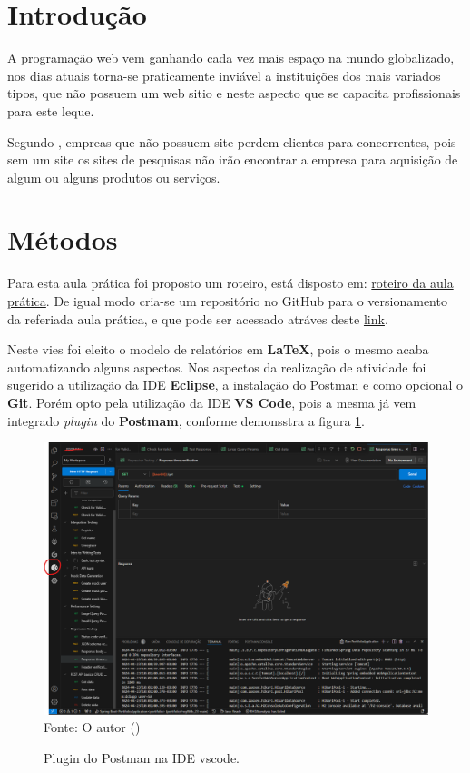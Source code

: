 
\section{Introdução}

\par A programação web vem ganhando cada vez mais espaço na mundo globalizado, nos dias atuais torna-se praticamente inviável a instituições dos mais variados tipos, que não possuem um web sitio e neste aspecto que se capacita profissionais para este leque.
\par Segundo , empreas que não possuem site perdem clientes para concorrentes, pois sem um site os sites de pesquisas não irão encontrar a empresa para aquisição de algum ou alguns produtos ou serviços.




\section{Métodos}
\par Para esta aula prática foi proposto um roteiro, está disposto em: \href {https://github.com/ENGENHARIA-DE-SOFTWARE-UNOPAR/web-project/blob/main/Roteiro%20aula%20pr%C3%A1tica.pdf} {roteiro da aula prática}. De igual modo cria-se um repositório no GitHub para o versionamento da referiada aula prática, e que pode ser acessado atráves deste \href {https://github.com/ENGENHARIA-DE-SOFTWARE-UNOPAR/web-project} {link}.
\par Neste vies foi eleito o modelo de relatórios em \textbf{LaTeX}, pois o mesmo acaba automatizando alguns aspectos. Nos aspectos da realização de atividade foi sugerido a utilização da IDE \textbf{Eclipse}, a instalação do \textbf{}{Postman} e como opcional o \textbf{Git}. Porém opto pela utilização da IDE \textbf{VS Code}, pois a mesma já vem integrado \textit{plugin} do \textbf{Postmam}, conforme demonsstra a figura \ref{fig:pos}.

\begin{figure}[H]
\center
  \caption{Plugin do Postman na IDE vscode.}
  \includegraphics[width=\textwidth]{figure/postman_vscode.png}
  \label{fig:pos}
  \flushleft %
    {\fontsize{10pt}{\baselineskip}\selectfont
    Fonte: O autor (\the\year) }
\end{figure}

